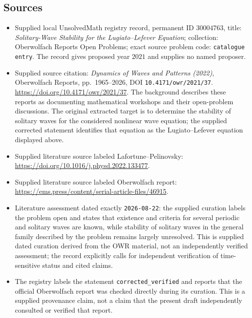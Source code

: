 \documentclass[11pt]{article}
\begin{document}
\subsection{Sources}
\begin{itemize}
\item Supplied local UnsolvedMath registry record, permanent ID \(30004763\), title: \emph{Solitary-Wave Stability for the Lugiato--Lefever Equation}; collection: Oberwolfach Reports Open Problems; exact source problem code: \texttt{catalogue entry}. The record gives proposed year \(2021\) and supplies no named proposer.
\item Supplied source citation: \emph{Dynamics of Waves and Patterns (2022)}, Oberwolfach Reports, pp.\ 1965--2026, DOI \texttt{10.4171/owr/2021/37}. \url{https://doi.org/10.4171/owr/2021/37}. The background describes these reports as documenting mathematical workshops and their open-problem discussions. The original extracted target is to determine the stability of solitary waves for the considered nonlinear wave equation; the supplied corrected statement identifies that equation as the Lugiato--Lefever equation displayed above.
\item Supplied literature source labeled Lafortune--Pelinovsky: \url{https://doi.org/10.1016/j.physd.2022.133477}.
\item Supplied literature source labeled Oberwolfach report: \url{https://ems.press/content/serial-article-files/46915}.
\item Literature assessment dated exactly \texttt{2026-08-22}: the supplied curation labels the problem open and states that existence and criteria for several periodic and solitary waves are known, while stability of solitary waves in the general family described by the problem remains largely unresolved. This is supplied dated curation derived from the OWR material, not an independently verified assessment; the record explicitly calls for independent verification of time-sensitive status and cited claims.
\item The registry labels the statement \texttt{corrected\_verified} and reports that the official Oberwolfach report was checked directly during its curation. This is a supplied provenance claim, not a claim that the present draft independently consulted or verified that report.
\end{itemize}
\end{document}
